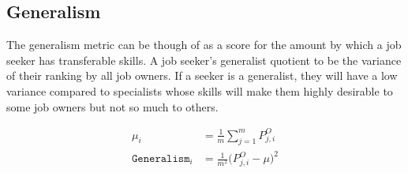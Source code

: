 \subsection{Generalism}

The generalism metric can be though of as a score for the amount by which a job seeker has transferable skills. A job seeker's generalist quotient to be the variance of their ranking by all job owners. If a seeker is a generalist, they will have a low variance compared to specialists whose skills will make them highly desirable to some job owners but not so much to others.

\begin{align}
\mu_i &= \frac{1}{m} \sum_{j=1}^m P^O_{j,i} \\
\texttt{Generalism}_i &= \frac{1}{m^2} \big(P^O_{j,i} - \mu \big)^2
\end{align}
